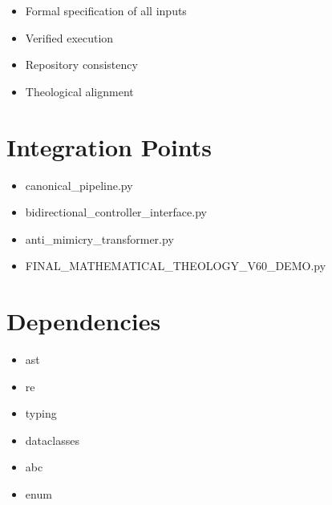 ﻿\documentclass[12pt]{article}
\begin{document}
\begin{itemize}    \item Formal specification of all inputs
    \item Verified execution
    \item Repository consistency
    \item Theological alignment
\end{itemize}

\section{Integration Points}

\begin{itemize}    \item canonical_pipeline.py
    \item bidirectional_controller_interface.py
    \item anti_mimicry_transformer.py
    \item FINAL_MATHEMATICAL_THEOLOGY_V60_DEMO.py
\end{itemize}

\section{Dependencies}

\begin{itemize}    \item ast
    \item re
    \item typing
    \item dataclasses
    \item abc
    \item enum
\end{itemize}
\end{document}
